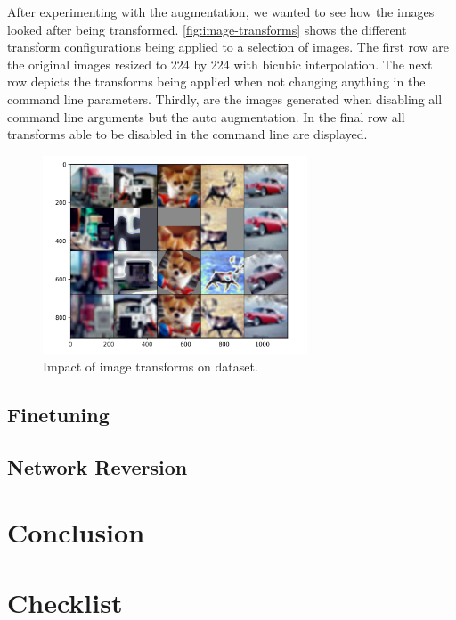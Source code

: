 \documentclass{article}
\begin{document}
    After experimenting with the augmentation, we wanted to see how the images looked after being transformed.
    \autoref{fig:image-transforms} shows the different transform configurations being applied to a selection of images.
    The first row are the original images resized to 224 by 224 with bicubic interpolation.
    The next row depicts the transforms being applied when not changing anything in the command line parameters.
    Thirdly, are the images generated when disabling all command line arguments but the auto augmentation.
    In the final row all transforms able to be disabled in the command line are displayed.
    \begin{figure}[h]
        \centering
        \includegraphics[width=0.7\textwidth]{images/image_transforms}
        \caption{Impact of image transforms on dataset.}
        \label{fig:image-transforms}
    \end{figure}

    \subsection{Finetuning}\label{subsec:finetuning}

    \subsection{Network Reversion}\label{subsec:network-reversion}


    \section{Conclusion}\label{sec:conclusion}

    \printbibliography
    \section*{Checklist}
    
\end{document}
